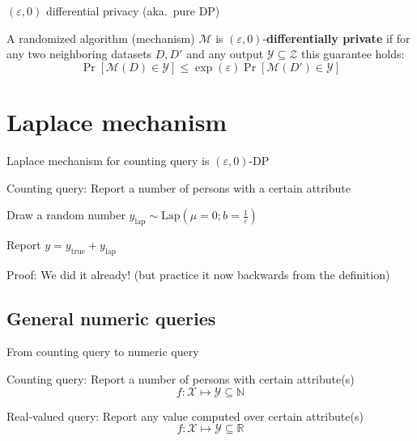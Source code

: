 \documentclass[12pt,aspectratio=169,handout]{beamer}
\begin{document}
\begin{frame}{$(\varepsilon, 0)$ differential privacy (aka.\ pure DP)}

A randomized algorithm (mechanism) $\mathcal{M}$ is $(\varepsilon, 0)$-\textbf{differentially private} if for any two neighboring datasets $D, D'$ and any output $\mathcal{Y} \subseteq \mathcal{Z}$ this guarantee holds:
$$
\Pr[\mathcal{M}(D) \in \mathcal{Y}] \leq \exp(\varepsilon) \Pr[\mathcal{M}(D') \in \mathcal{Y}]
$$


\end{frame}


\section{Laplace mechanism}

\begin{frame}{Laplace mechanism for counting query is $(\varepsilon, 0)$-DP}

Counting query: Report a number of persons with a certain attribute

Draw a random number $y_{\mathrm{lap}} \sim \textrm{Lap}(\mu = 0; b=\frac{1}{\varepsilon})$

Report $y = y_{\mathrm{true}} + y_{\mathrm{lap}}$


Proof: We did it already! (but practice it now backwards from the definition)


\end{frame}


\subsection{General numeric queries}

\begin{frame}{From counting query to numeric query}

Counting query: Report a number of persons with certain attribute(s)
$$
f: \mathcal{X} \mapsto \mathcal{Y} \subseteq \mathbb{N}
$$

Real-valued query: Report any value computed over certain attribute(s)
$$
f: \mathcal{X} \mapsto \mathcal{Y} \subseteq \mathbb{R}
$$

\end{frame}
\end{document}
